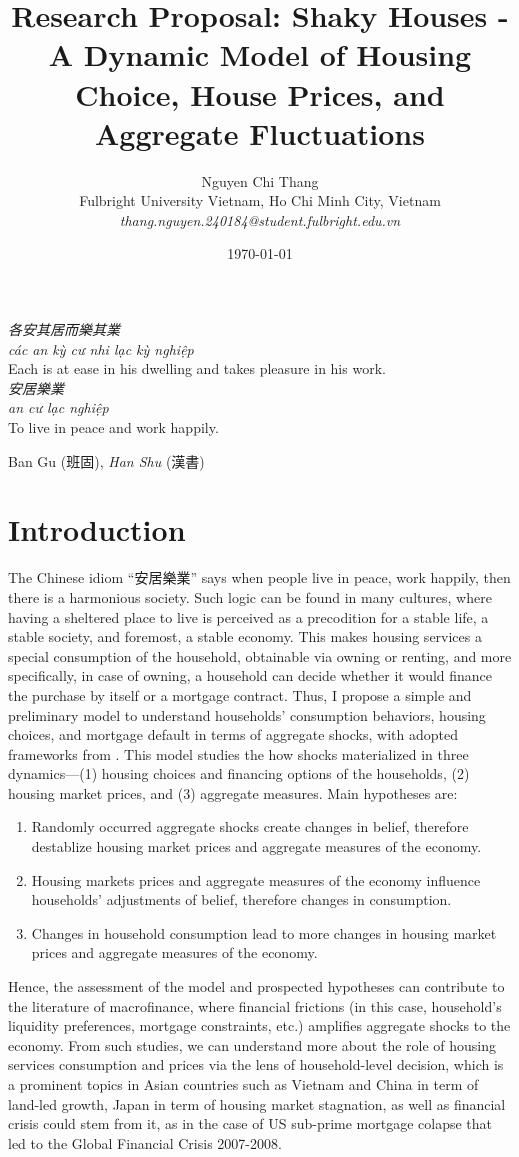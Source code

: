 \documentclass{style/fulbright}
\title{Research Proposal: Shaky Houses - A Dynamic Model of Housing Choice, House Prices, and Aggregate Fluctuations}
\author{Nguyen Chi Thang \\
  \small{Fulbright University Vietnam, Ho Chi Minh City, Vietnam \\
         \textit{thang.nguyen.240184@student.fulbright.edu.vn}}}
\date{\today}
\begin{document}
\maketitle

\epigraph{%
  \textit{各安其居而樂其業} \\
  \textit{các an kỳ cư nhi lạc kỳ nghiệp} \\
  Each is at ease in his dwelling and takes pleasure in his work.
  \\[1.2ex]
  \textit{安居樂業} \\
  \textit{an cư lạc nghiệp} \\
  To live in peace and work happily.%
}{Ban Gu (班固), \textit{Han Shu} (漢書)}

\section{Introduction}
The Chinese idiom “安居樂業” says when people live in peace, work happily, then there is a harmonious society. Such logic can be found in many cultures, where having a sheltered place to live is perceived as a precodition for a stable life, a stable society, and foremost, a stable economy. This makes housing services a special consumption of the household, obtainable via owning or renting, and more specifically, in case of owning, a household can decide whether it would finance the purchase by itself or a mortgage contract. Thus, I propose a simple and preliminary model to understand households' consumption behaviors, housing choices, and mortgage default in terms of aggregate shocks, with adopted frameworks from . This model studies the how shocks materialized in three dynamics—(1) housing choices and financing options of the households, (2) housing market prices, and (3) aggregate measures. Main hypotheses are: \begin{enumerate}
  \item Randomly occurred aggregate shocks create changes in belief, therefore destablize housing market prices and aggregate measures of the economy.
  \item Housing markets prices and aggregate measures of the economy influence households' adjustments of belief, therefore changes in consumption.
  \item Changes in household consumption lead to more changes in housing market prices and aggregate measures of the economy.
\end{enumerate}
Hence, the assessment of the model and prospected hypotheses can contribute to the literature of macrofinance, where financial frictions (in this case, household's liquidity preferences,  mortgage constraints, etc.) amplifies aggregate shocks to the economy. From such studies, we can understand more about the role of housing services consumption and prices via the lens of household-level decision, which is a prominent topics in Asian countries such as Vietnam and China in term of land-led growth, Japan in term of housing market stagnation, as well as financial crisis could stem from it, as in the case of US sub-prime mortgage colapse that led to the Global Financial Crisis 2007-2008. 
\end{document}

